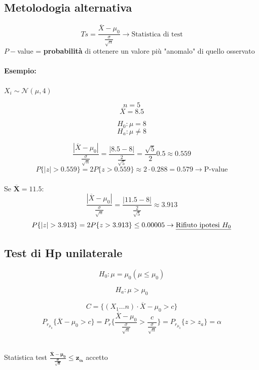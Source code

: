 \documentclass[]{article}
\begin{document}
    \subsection{Metolodogia alternativa}
    \[ Ts = \frac{\overline{X} - \mu_0}{\frac{\sigma}{\sqrt{n}}} \rightarrow \text{Statistica di test} \]
    $P-$value = \textbf{probabilità} di ottenere un valore più "anomalo" di quello osservato
    \paragraph{Esempio:} $X_i \sim \mathcal{N}(\mu, 4)$ \\
    \begin{minipage}{0.5\textwidth}
        \[ n = 5 \]
        \[ \overline{X} = 8.5\]
    \end{minipage}
    \begin{minipage}{0.5\textwidth}
        \[ H_0 : \mu = 8 \]
        \[ H_a : \mu \not = 8\]
    \end{minipage}
    \[ \frac{|\overline{X} - \mu_0|}{\frac{\sigma}{\sqrt{n}}} = \frac{|8.5 - 8|}{\frac{2}{\sqrt{5}}} = \frac{\sqrt{5}}{2} 0.5 \approx 0.559 \]
    \[ P \{ |z| > 0.559 \} = 2P \{ z > 0.559 \} \approx 2 \cdot 0.288 = 0.579 \rightarrow \text{P-value}\] \\[2ex]
    Se $\boldsymbol{\overline{X} = 11.5}$:
    \[ \frac{|\overline{X} - \mu_0|}{\frac{\sigma}{\sqrt{n}}} = \frac{|11.5 - 8|}{\frac{2}{\sqrt{5}}} \approx 3.913 \]
    \[ P \{ |z| > 3.913 \} = 2P \{ z > 3.913 \} \leq 0.00005 \rightarrow \text{\underline{Rifiuto ipotesi $H_0$}}\]
    \subsection{Test di Hp unilaterale}
    \begin{minipage}{0.5\textwidth}
        \[ H_0 : \mu = \mu_0 (\mu \leq \mu_0) \]
    \end{minipage}
    \begin{minipage}{0.5\textwidth}
        \[ H_a : \mu > \mu_0 \]
    \end{minipage}
    \[ C = \{ (X_1 \ldots n) \cdot \overline{X} - \mu_0 > c \} \]
    \[ P_{r_{\mu_0}} \{ \overline{X} - \mu_0 > c \} = P_r \{ \frac{\overline{X} - \mu_0}{\frac{\sigma}{\sqrt{n}}} > \frac{c}{\frac{\sigma}{\sqrt{n}}}\} = P_{r_{\mu_0}} \{ z > z_a \} = \alpha \] \\[2ex]
    \centerline{Statistica test $\boldsymbol{\frac{\overline{X} - \mu_0}{\frac{\sigma}{\sqrt{n}}} \leq z_\alpha}$ accetto}
\end{document}
